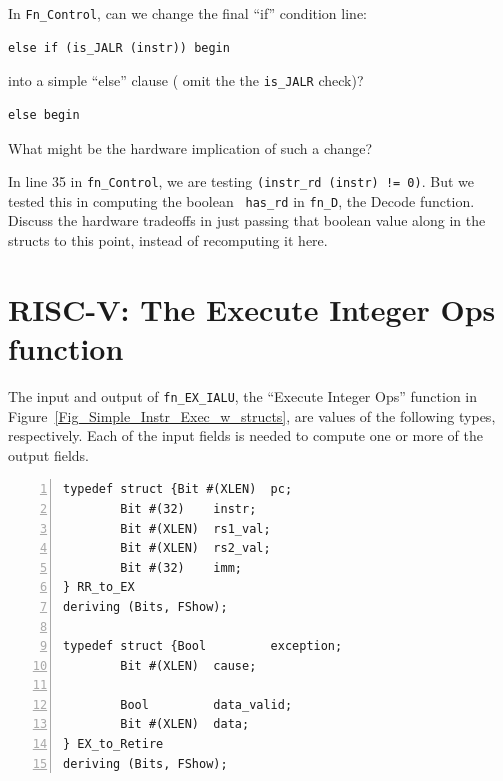 \Exercise

In \verb|Fn_Control|, can we change the final ``if'' condition line:

{\small
\begin{Verbatim}[frame=single]
   else if (is_JALR (instr)) begin
\end{Verbatim}
}

into a simple ``else'' clause ({\ie} omit the the \verb|is_JALR| check)?

{\small
\begin{Verbatim}[frame=single]
   else begin
\end{Verbatim}
}

What might be the hardware implication of such a change?

\Exercise

In line 35 in {\tt fn\_Control}, we are testing {\tt (instr\_rd
(instr) != 0)}.  But we tested this in computing the boolean {\tt
has\_rd} in {\tt fn\_D}, the Decode function.  Discuss the hardware
tradeoffs in just passing that boolean value along in the structs to
this point, instead of recomputing it here.

\Endexercise


\section{RISC-V: The Execute Integer Ops function}

\label{Sec_EXI_function}


The input and output of \verb|fn_EX_IALU|, the ``Execute Integer Ops''
function in Figure~\ref{Fig_Simple_Instr_Exec_w_structs}, are values
of the following types, respectively.  Each of the input fields is
needed to compute one or more of the output fields.

{\small
\begin{Verbatim}[frame=single, numbers=left]
typedef struct {Bit #(XLEN)  pc;
		Bit #(32)    instr;
		Bit #(XLEN)  rs1_val;
		Bit #(XLEN)  rs2_val;
		Bit #(32)    imm;
} RR_to_EX
deriving (Bits, FShow);

typedef struct {Bool         exception;
		Bit #(XLEN)  cause;

		Bool         data_valid;
		Bit #(XLEN)  data;
} EX_to_Retire
deriving (Bits, FShow);
\end{Verbatim}
}

